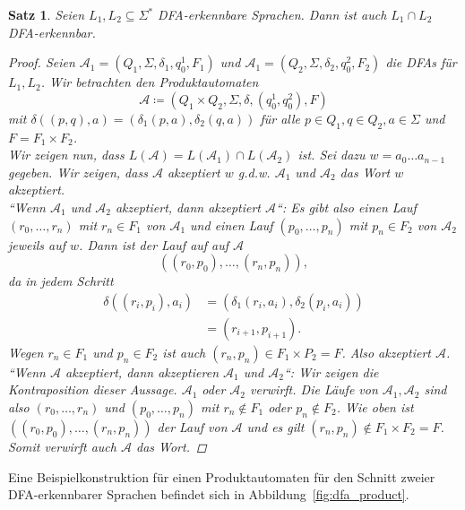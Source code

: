 \documentclass[11pt, a4paper]{article}
\theoremstyle{definition}
\theoremstyle{plain}
\newtheorem{theorem}[definition]{Satz}
\numberwithin{equation}{section}
\begin{document}
\begin{theorem}\label{thm:regular_intersection}
	Seien \( L_1, L_2 \subseteq \Sigma^\ast \) DFA-erkennbare Sprachen. Dann ist auch \( L_1 \cap L_2 \) DFA-erkennbar.
	\begin{proof}
		Seien \( \mathcal{A}_1 = (Q_1, \Sigma, \delta_1, q_0^1, F_1) \) und \( \mathcal{A}_1 = (Q_2, \Sigma, \delta_2, q_0^2, F_2) \) die DFAs für \( L_1, L_2 \). Wir betrachten den \textit{Produktautomaten}
		\[
			\mathcal{A} \coloneqq (Q_1 \times Q_2, \Sigma, \delta, (q_0^1, q_0^2), F)
		\]
		mit \( \delta((p, q), a) = (\delta_1(p, a), \delta_2(q, a)) \) für alle \( p \in Q_1, q \in Q_2, a \in \Sigma \) und \( F = F_1 \times F_2 \).\\
		Wir zeigen nun, dass \( L(\mathcal{A}) = L(\mathcal{A}_1) \cap L(\mathcal{A}_2) \) ist.
		Sei dazu \( w = a_0 \ldots a_{n-1} \) gegeben. Wir zeigen, dass \( \mathcal{A} \) akzeptiert \( w \) {g.d.w.} \( \mathcal{A}_1 \) und \( \mathcal{A}_2 \) das Wort \( w \) akzeptiert.\\
		``Wenn \( \mathcal{A}_1 \) und \( \mathcal{A}_2 \) akzeptiert, dann akzeptiert \( \mathcal{A} \)``:
		Es gibt also einen Lauf \( (r_0, \ldots, r_n) \) mit \( r_n \in F_1 \) von \( \mathcal{A}_1 \) und einen Lauf \( (p_0, \ldots, p_n) \) mit \( p_n \in F_2 \) von \( \mathcal{A}_2 \) jeweils auf \( w \). Dann ist der Lauf auf auf \( \mathcal{A} \)
		\[
			((r_0, p_0), \ldots, (r_n, p_n)),
		\]
		da in jedem Schritt 
		\begin{align*}
			\delta((r_i, p_i), a_i) &= (\delta_1(r_i, a_i), \delta_2(p_i, a_i)) \\
			&= (r_{i+1}, p_{i+1}).
		\end{align*}
		Wegen \( r_n \in F_1 \) und \( p_n \in F_2 \) ist auch \( (r_n, p_n) \in F_1 \times P_2 = F \). Also akzeptiert \( \mathcal{A} \).\\
		``Wenn \( \mathcal{A} \) akzeptiert, dann akzeptieren \( \mathcal{A}_1 \) und \( \mathcal{A}_2 \)``:
		Wir zeigen die Kontraposition dieser Aussage. \( \mathcal{A}_1 \) oder \( \mathcal{A}_2 \) verwirft. Die Läufe von \( \mathcal{A}_1, \mathcal{A}_2 \) sind also \( (r_0, \ldots, r_n) \) und \( (p_0, \ldots, p_n) \) mit \( r_n \notin F_1 \) oder \( p_n \notin F_2 \). Wie oben ist \( ((r_0, p_0), \ldots, (r_n, p_n)) \) der Lauf von \( \mathcal{A} \) und es gilt \( (r_n, p_n) \notin F_1 \times F_2 = F \). Somit verwirft auch \( \mathcal{A} \) das Wort.
	\end{proof}
\end{theorem}
Eine Beispielkonstruktion für einen Produktautomaten für den Schnitt zweier DFA-erkennbarer Sprachen befindet sich in Abbildung~\ref{fig:dfa_product}.
\end{document}
